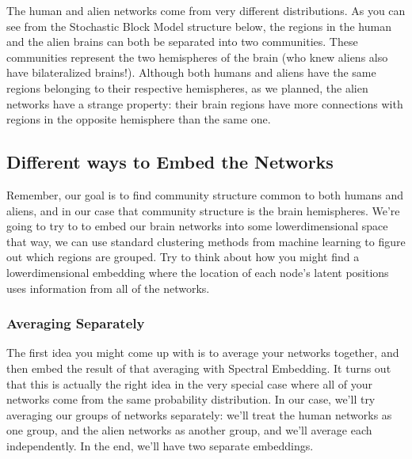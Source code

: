 \documentclass[letterpaper,10pt,english]{jupyterBook}
\begin{document}
\sphinxAtStartPar
The human and alien networks come from very different distributions. As you can see from the Stochastic Block Model structure below, the regions in the human and the alien brains can both be separated into two communities. These communities represent the two hemispheres of the brain (who knew aliens also have bilateralized brains!). Although both humans and aliens have the same regions belonging to their respective hemispheres, as we planned, the alien networks have a strange property: their brain regions have more connections with regions in the opposite hemisphere than the same one.

\noindent{}


\subsection{Different ways to Embed the Networks}
\label{\detokenize{representations/ch6/multigraph-representation-learning:different-ways-to-embed-the-networks}}
\sphinxAtStartPar
Remember, our goal is to find community structure common to both humans and aliens, and in our case that community structure is the brain hemispheres. We’re going to try to to embed our brain networks into some lower\sphinxhyphen{}dimensional space \sphinxhyphen{} that way, we can use standard clustering methods from machine learning to figure out which regions are grouped. Try to think about how you might find a lower\sphinxhyphen{}dimensional embedding where the location of each node’s latent positions uses information from all of the networks.


\subsubsection{Averaging Separately}
\label{\detokenize{representations/ch6/multigraph-representation-learning:averaging-separately}}
\sphinxAtStartPar
The first idea you might come up with is to average your networks together, and then embed the result of that averaging with Spectral Embedding. It turns out that this is actually the right idea in the very special case where all of your networks come from the same probability distribution. In our case, we’ll try averaging our groups of networks separately: we’ll treat the human networks as one group, and the alien networks as another group, and we’ll average each independently. In the end, we’ll have two separate embeddings.
\end{document}
